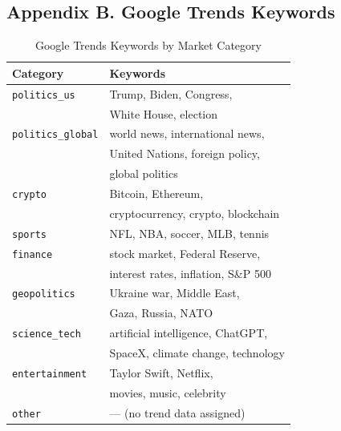 \documentclass[11pt,twocolumn]{article}
\begin{document}
\subsection*{Appendix B. Google Trends Keywords}
\label{sec:google-trends}
\begin{table}[H]
\centering

\begin{tabular}{ll}
\toprule
\textbf{Category} & \textbf{Keywords} \\
\midrule
\texttt{politics\_us}     & Trump, Biden, Congress, \\
                          & White House, election \\
\texttt{politics\_global} & world news, international news, \\
                          & United Nations, foreign policy, \\
                          & global politics \\
\texttt{crypto}           & Bitcoin, Ethereum, \\
                          & cryptocurrency, crypto, blockchain \\
\texttt{sports}           & NFL, NBA, soccer, MLB, tennis \\
\texttt{finance}          & stock market, Federal Reserve, \\
                          & interest rates, inflation, S\&P 500 \\
\texttt{geopolitics}      & Ukraine war, Middle East, \\
                          & Gaza, Russia, NATO \\
\texttt{science\_tech}    & artificial intelligence, ChatGPT, \\
                          & SpaceX, climate change, technology \\
\texttt{entertainment}    & Taylor Swift, Netflix, \\
                          & movies, music, celebrity \\
\texttt{other}            & --- (no trend data assigned) \\
\bottomrule
\end{tabular}
\caption{Google Trends Keywords by Market Category}
\label{tab:trends_keywords}
\end{table}

\end{document}
